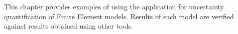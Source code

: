 This chapter provides examples of using the \texttt{\getsoftwarename{}} application for uncertainty
quantification of Finite Element models. Results of each model are verified against results
obtained using other tools. 
\\

%
%
%

